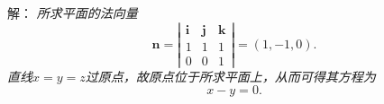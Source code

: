 
\titlepage



\begin{frame}
	\linespread{1.5}
	
	\bigskip
	
	\small 解：\it
	所求平面的法向量
	$$\bm{n}=\left|\begin{array}{ccc}
		\bm{i} & \bm{j} & \bm{k}\\
		1 & 1 & 1 \\
		0 & 0 & 1
	\end{array}\right|=(1,-1,0).$$
	直线$x=y=z$过原点，故原点位于所求平面上，从而可得其方程为
	$$x-y=0.$$
	\fin
\end{frame}

